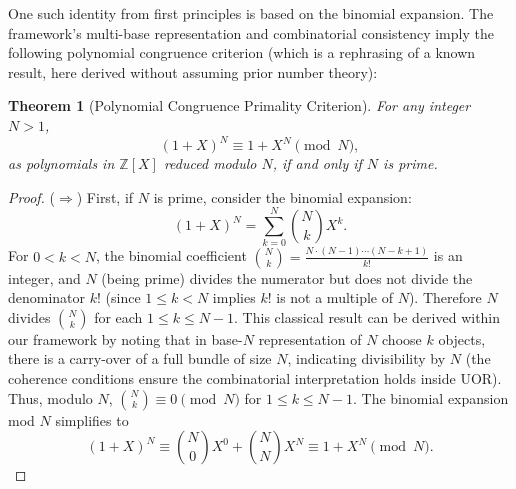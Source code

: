 \documentclass[11pt]{article}
\newtheorem{theorem}{Theorem}
\begin{document}
{One such identity from first principles is based on the binomial expansion. The framework’s multi-base representation and combinatorial consistency imply the following polynomial congruence criterion (which is a rephrasing of a known result, here derived without assuming prior number theory):

\begin{theorem}[Polynomial Congruence Primality Criterion]\label{thm:poly-criterion}
For any integer $N>1$, 
\[ (1+X)^N \equiv 1 + X^N \pmod{N}, \] 
as polynomials in $\mathbb{Z}[X]$ reduced modulo $N$, if and only if $N$ is prime.
\end{theorem}

\begin{proof}
($\Rightarrow$) First, if $N$ is prime, consider the binomial expansion: 
\[ (1+X)^N = \sum_{k=0}^N \binom{N}{k} X^k. \] 
For $0<k<N$, the binomial coefficient $\binom{N}{k} = \frac{N\cdot (N-1)\cdots (N-k+1)}{k!}$ is an integer, and $N$ (being prime) divides the numerator but does not divide the denominator $k!$ (since $1 \le k < N$ implies $k!$ is not a multiple of $N$). Therefore $N$ divides $\binom{N}{k}$ for each $1 \le k \le N-1$. This classical result can be derived within our framework by noting that in base-$N$ representation of $N$ choose $k$ objects, there is a carry-over of a full bundle of size $N$, indicating divisibility by $N$ (the coherence conditions ensure the combinatorial interpretation holds inside UOR). Thus, modulo $N$, $\binom{N}{k} \equiv 0 \pmod{N}$ for $1 \le k \le N-1$. The binomial expansion mod $N$ simplifies to 
\[ (1+X)^N \equiv \binom{N}{0}X^0 + \binom{N}{N}X^N \equiv 1 + X^N \pmod{N}. \]


\end{proof}}
\end{document}
